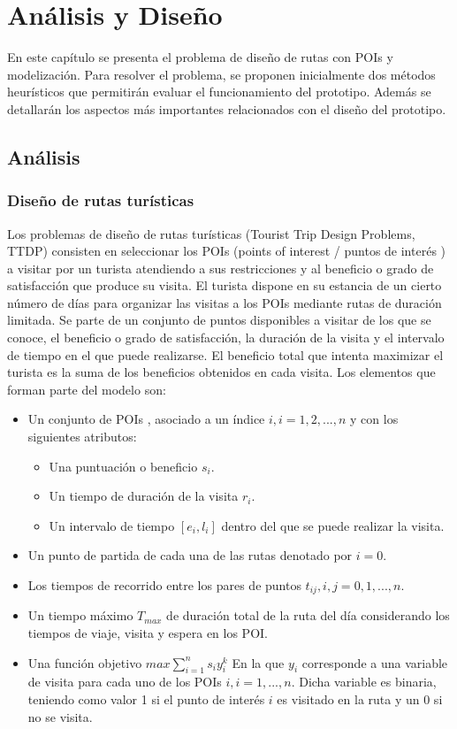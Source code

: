 \chapter{Análisis y Diseño}
En este capítulo se presenta el problema de diseño de rutas con POIs y modelización. Para resolver el problema, se proponen inicialmente dos métodos heurísticos que permitirán evaluar el funcionamiento del prototipo. Además se detallarán los aspectos más importantes relacionados con el diseño del prototipo.
\section[Análisis]{Análisis}
\subsection[Diseño de rutas turísticas]{Diseño de rutas turísticas}
Los problemas de diseño de rutas turísticas (Tourist Trip Design Problems, TTDP) consisten en seleccionar los POIs (points of interest / puntos de interés ) a visitar por un turista atendiendo a sus restricciones y al beneficio o grado de satisfacción que produce su visita. El turista dispone en su estancia de un cierto número de días para organizar las visitas a los POIs mediante rutas de duración limitada. Se parte de un conjunto de puntos disponibles a visitar de los que se conoce, el beneficio o grado de satisfacción, la duración de la visita y el intervalo de tiempo en el que puede realizarse. El beneficio total que intenta maximizar el turista es la suma de los beneficios obtenidos en cada visita.\newline
Los elementos que forman parte del modelo son:
\begin{itemize}
	\item Un conjunto de POIs , asociado a un índice $i, i=1,2,...,n$ y con los siguientes atributos:
	\begin{itemize}
		\item Una puntuación o beneficio $s_i$.
		\item Un tiempo de duración de la visita $r_i$.
		\item Un intervalo de tiempo $[e_i,l_i]$ dentro del que se puede realizar la visita.
	\end{itemize}
	\item Un punto de partida de cada una de las rutas denotado por $i=0$.
	\item Los tiempos de recorrido entre los pares de puntos $t_{ij}, i,j=0,1,...,n$.
	\item Un tiempo máximo $T_{max}$ de duración total de la ruta del día considerando los tiempos de viaje, visita y espera en los POI.
	\item Una función objetivo $max \sum_{i=1}^{n}s_iy_i^k$ \newline
	En la que $y_i$ corresponde a una variable de visita para cada uno de los POIs $i, i=1,...,n$. Dicha variable es binaria, teniendo como valor 1 si el punto de interés $i$ es visitado en la ruta y un 0 si no se visita.
\end{itemize}
